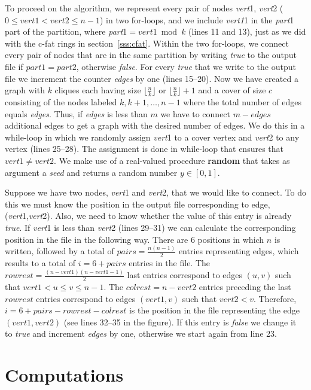 To proceed on the algorithm, we represent every pair of nodes {\em vert\/}1,
{\em vert\/}2 ($0 \leq vert1 < vert2 \leq n-1$) in two for-loops,
and we include {\em vert1\/}1 in the {\em part\/}1 part of the partition, where
{\em part\/}1$= {vert1 \bmod k}$ (lines 11 and 13), just as we did with the
c-fat rings in section~\ref{sss:cfat}. Within the two for-loops, we
connect every pair of nodes that are in the same partition by writing
{\em true\/} to the output file if $part1 = part2$, otherwise {\em
false}. For every {\em true\/} that we write to the output file we
increment the counter {\em edges\/} by one (lines 15--20). Now we have
created a graph with $k$ cliques each having size $\lfloor \frac{n}{k} \rfloor$
or $\lfloor \frac{n}{k} \rfloor+1$ and a cover of size $c$ consisting
of the nodes labeled $k,k+1,\ldots,n-1$ where the total number of
edges equals {\em edges}. Thus, if {\em edges\/} is less than $m$ we
have to connect $m-edges$ additional edges to get a graph with the
desired number of edges. We do this in a while-loop in which we
randomly assign {\em vert\/}1 to a cover vertex and {\em vert\/}2
to any vertex (lines 25--28). The assignment is done
in while-loop that ensures that $vert1 \neq vert2$.
We make use of a real-valued procedure {\bf random}
that takes as argument a {\em seed} and returns a random number $y \in [0,1]$.

Suppose we have two nodes, {\em vert\/}1 and {\em vert\/}2, that we would
like to connect. To do this we must know the position in the output file
corresponding to edge, ({\em vert\/}1,{\em vert\/}2). Also, we need to know
whether the value of this entry is already {\em true}. If {\em vert\/}1 is
less than {\em vert\/}2 (lines 29--31) we can calculate the corresponding
position in the file in the following way.
There are 6 positions in which $n$ is written, followed by
a total of $pairs = \frac{n(n-1)}{2}$ entries representing edges, which
results to a total of $i = 6+pairs$ entries in the file. The $rowrest =
\frac{(n-vert1)(n-vert1-1)}{2}$ last entries correspond to
edges $(u,v)$ such that $vert1 < u \leq v \leq n-1$. The $colrest = n-vert2$
entries preceding the last $rowrest$ entries correspond to edges $(vert1,v)$
such that $vert2 < v$. Therefore, $i = 6+pairs-rowrest-colrest$ is
the position in the file representing the edge $(vert1,vert2)$ (see
lines 32--35 in the figure). If this entry is {\em false\/} we change it
to {\em true\/} and increment {\em edges\/} by one, otherwise we start again
from line 23.

\section{Computations}


